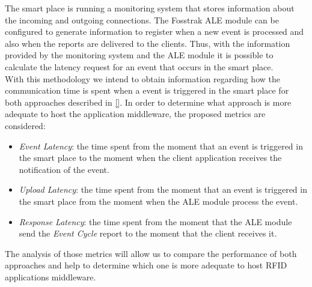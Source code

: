 The smart place is running a monitoring system that stores information about the incoming and outgoing
connections. The Fosstrak \gls{ALE} module can be configured to generate information to register
when a new event is processed and also when the reports are delivered to the clients. Thus, with the
information provided by the monitoring system and the \gls{ALE} module it is possible to calculate
the latency request for an event that occurs in the smart place.\\

With this methodology we intend to obtain information regarding how the communication time is spent
when a event is triggered in the smart place for both approaches described in \ref{}. In order to
determine what approach is more adequate to host the application middleware, the proposed metrics
are considered:

\begin{itemize}
  \item \textit{Event Latency}: the time spent from the moment that an event is triggered in the
  smart place to the moment when the client application receives the notification of the event.
  \item \textit{Upload Latency}: the time spent from the moment that an event is triggered in the
  smart place from the moment when the \gls{ALE} module process the event.
  \item \textit{Response Latency}: the time spent from the moment that the \gls{ALE} module send
  the \textit{Event Cycle} report to the moment that the client receives it.
\end{itemize}

The analysis of those metrics will allow us to compare the performance of both approaches and help to
determine which one is more adequate to host \gls{RFID} applications middleware.

%
%
%
%


